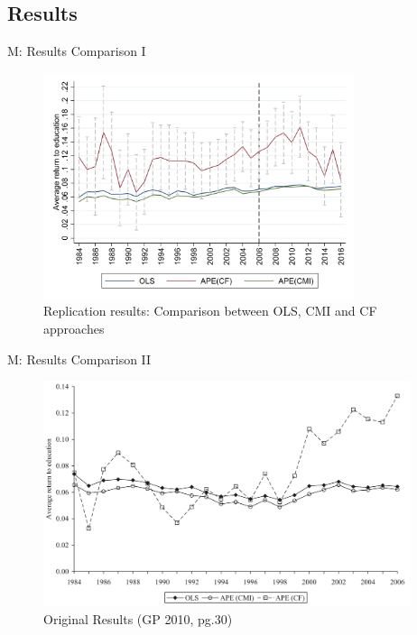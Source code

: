 \documentclass[10pt,ignorenonframetext,]{beamer}
\begin{document}
\hypertarget{results}{%
\subsection{Results}\label{results}}

\begin{frame}{M: Results Comparison I}
\protect\hypertarget{m-results-comparison-i}{}

\begin{figure}
\centering
\includegraphics[width=\textwidth,height=2.60417in]{img/results.png}
\caption{Replication results: Comparison between OLS, CMI and CF
approaches}
\end{figure}

\end{frame}

\begin{frame}{M: Results Comparison II}
\protect\hypertarget{m-results-comparison-ii}{}

\begin{figure}
\centering
\includegraphics[width=\textwidth,height=2.60417in]{img/OLS_CMI_CF_GB2010.png}
\caption{Original Results (GP 2010, pg.30)}
\end{figure}

\end{frame}
\end{document}
